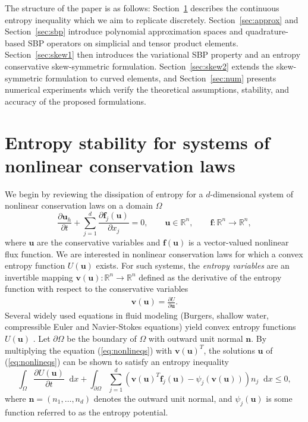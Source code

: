 \documentclass{svjour3}                     %
\newcommand*\diff[1]{\mathop{}\!{\mathrm{d}#1}}
\newcommand{\pd}[2]{\frac{\partial#1}{\partial#2}}
\newcommand{\LRp}[1]{\left( #1 \right)}
\renewcommand{\note}[1]{{\color{blue}{#1}}}
\begin{document}
The structure of the paper is as follows: Section~\ref{sec:nonlin} describes the continuous entropy inequality which we aim to replicate discretely.  Section~\ref{sec:approx} and Section~\ref{sec:sbp} introduce polynomial approximation spaces and quadrature-based SBP operators on simplicial and tensor product elements.  Section~\ref{sec:skew1} then introduces the variational SBP property and an entropy conservative skew-symmetric formulation.  Section~\ref{sec:skew2} extends the skew-symmetric formulation to curved elements, and Section~\ref{sec:num} presents numerical experiments which verify the theoretical assumptions, stability, and accuracy of the proposed formulations.



\section{Entropy stability for systems of nonlinear conservation laws}
\label{sec:nonlin} 

We begin by reviewing the dissipation of entropy for a $d$-dimensional system of nonlinear conservation laws on a domain $\Omega$
\begin{equation}
\pd{\bm{u}_h}{t}  + \sum_{j=1}^d\pd{\bm{f}_j(\bm{u})}{x_j} = 0, \qquad \bm{u}\in \mathbb{R}^n, \qquad \bm{f}:\mathbb{R}^n\rightarrow\mathbb{R}^n,
\label{eq:nonlineqs}
\end{equation}
where $\bm{u}$ are the conservative variables and $\bm{f}(\bm{u})$ is a vector-valued nonlinear flux function.  We are interested in nonlinear conservation laws for which a convex entropy function $U(\bm{u})$ exists.  For such systems, the  \emph{entropy variables} are an invertible mapping $\bm{v}(\bm{u}):\mathbb{R}^n\rightarrow \mathbb{R}^n$ defined as the derivative of the entropy function with respect to the conservative variables 
\begin{align}
\bm{v}(\bm{u}) = \pd{U}{\bm{u}}.%
\label{eq:entropyvarsmap}
\end{align}
Several widely used equations in fluid modeling (Burgers, shallow water, compressible Euler and Navier-Stokes equations) yield convex entropy functions $U(\bm{u})$ \cite{hughes1986new, chen2017entropy}.  Let $\partial \Omega$ be the boundary of $\Omega$ with outward unit normal $\bm{n}$.  By multiplying the equation (\ref{eq:nonlineqs}) with $\bm{v}(\bm{u})^T$, the solutions $\bm{u}$ of (\ref{eq:nonlineqs}) can be shown to satisfy an entropy inequality
\begin{equation}
\int_{\Omega}\pd{U(\bm{u})}{t}\diff{x} + \int_{\partial \Omega} \sum_{j=1}^d \LRp{\bm{v}(\bm{u})^T\bm{f}_j(\bm{u}) - \psi_j\LRp{\bm{v}(\bm{u})}}n_j \diff{x} \leq 0, 
\label{eq:entropyineq}
\end{equation}
where $\bm{n} = \LRp{n_1,\ldots,n_d}$ denotes the outward unit normal, and $\psi_j(\bm{u})$ is some function referred to as the entropy potential.  
\end{document}
